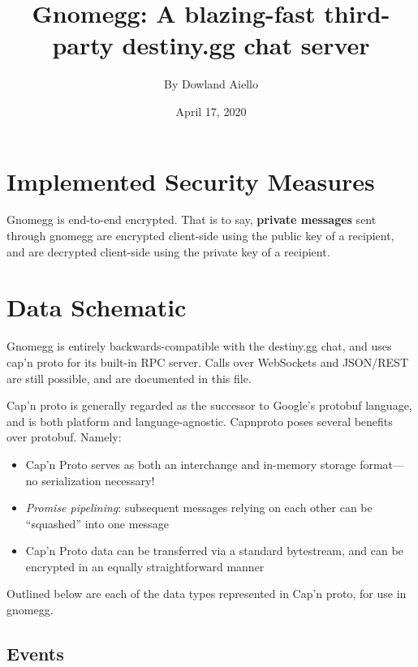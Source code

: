 \documentclass{article}
\begin{document}
\title{Gnomegg: A blazing-fast third-party destiny.gg chat server}
\author{By Dowland Aiello}
\date{April 17, 2020}

\maketitle
\tableofcontents
\fancyhf{}

\newpage

\section{Implemented Security Measures}

Gnomegg is end-to-end encrypted. That is to say, \textbf{private messages} sent
through gnomegg are encrypted client-side using the public key of a recipient,
and are decrypted client-side using the private key of a recipient.

\section{Data Schematic}

Gnomegg is entirely backwards-compatible with the destiny.gg chat, and uses
cap'n proto for its built-in RPC server. Calls over WebSockets and JSON/REST are
still possible, and are documented in this file.

Cap'n proto is generally regarded as the successor to Google's
protobuf language, and is both platform and language-agnostic. Capnproto poses
several benefits over protobuf. Namely:

\begin{itemize}
	\item Cap'n Proto serves as both an interchange and in-memory storage
		format---no serialization necessary!
	\item \emph{Promise pipelining}: subsequent messages relying on each other
		can be ``squashed'' into one message
	\item Cap'n Proto data can be transferred via a standard bytestream, and can
		be encrypted in an equally straightforward manner
\end{itemize}

Outlined below are each of the data types represented in Cap'n proto, for use
in gnomegg.

\subsection{Events}
\end{document}
